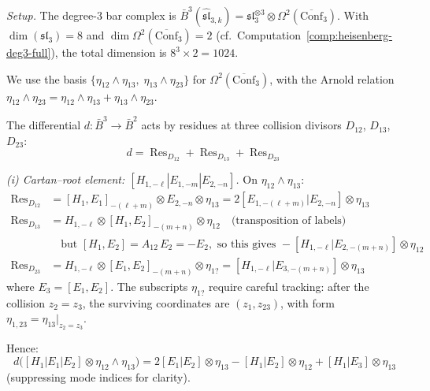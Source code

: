 \begin{computation}
\label{comp:sl3-degree3-complete}

\emph{Setup.}
The degree-3 bar complex is
$\bar{B}^3(\widehat{\mathfrak{sl}}_{3,k}) = \mathfrak{sl}_3^{\otimes 3}
\otimes \Omega^2(\overline{\mathrm{Conf}}_3)$.
With $\dim(\mathfrak{sl}_3) = 8$ and
$\dim \Omega^2(\overline{\mathrm{Conf}}_3) = 2$
(cf.\ Computation~\ref{comp:heisenberg-deg3-full}), the total dimension is
$8^3 \times 2 = 1024$.

We use the basis $\{\eta_{12}\wedge\eta_{13},\; \eta_{13}\wedge\eta_{23}\}$
for $\Omega^2(\overline{\mathrm{Conf}}_3)$, with the Arnold relation
$\eta_{12}\wedge\eta_{23} = \eta_{12}\wedge\eta_{13} + \eta_{13}\wedge\eta_{23}$.

The differential $d\colon \bar{B}^3 \to \bar{B}^2$ acts by residues at three
collision divisors $D_{12}$, $D_{13}$, $D_{23}$:
\[
d = \operatorname{Res}_{D_{12}} + \operatorname{Res}_{D_{13}} + \operatorname{Res}_{D_{23}}
\]

\emph{(i) Cartan--root element: $[H_{1,-\ell}|E_{1,-m}|E_{2,-n}]$.}
On $\eta_{12} \wedge \eta_{13}$:
\begin{align*}
\operatorname{Res}_{D_{12}} &= [H_1, E_1]_{-(\ell+m)} \otimes E_{2,-n} \otimes \eta_{13}
= 2[E_{1,-(\ell+m)}|E_{2,-n}] \otimes \eta_{13} \\
\operatorname{Res}_{D_{13}} &= H_{1,-\ell} \otimes [H_1, E_2]_{-(m+n)} \otimes \eta_{12}
\quad\text{(transposition of labels)} \\
&\quad\text{but } [H_1, E_2] = A_{12}\,E_2 = -E_2, \text{ so this gives }
-[H_{1,-\ell}|E_{2,-(m+n)}] \otimes \eta_{12} \\
\operatorname{Res}_{D_{23}} &= H_{1,-\ell} \otimes [E_1, E_2]_{-(m+n)} \otimes \eta_{1?}
= [H_{1,-\ell}|E_{3,-(m+n)}] \otimes \eta_{13}
\end{align*}
where $E_3 = [E_1, E_2]$.  The subscripts $\eta_{1?}$ require careful tracking:
after the collision $z_2 = z_3$, the surviving coordinates are $(z_1, z_{23})$,
with form $\eta_{1,23} = \eta_{13}|_{z_2=z_3}$.

Hence:
\begin{equation}\label{eq:sl3-deg3-cartan-root}
d\bigl([H_{1}|E_1|E_2] \otimes \eta_{12}\wedge\eta_{13}\bigr)
= 2[E_1|E_2] \otimes \eta_{13}
- [H_1|E_2] \otimes \eta_{12}
+ [H_1|E_3] \otimes \eta_{13}
\end{equation}
(suppressing mode indices for clarity).


\end{computation}
